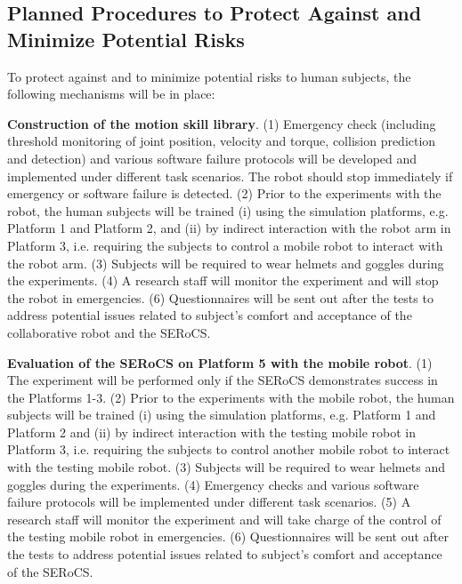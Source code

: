 \subsection{Planned Procedures to Protect Against and Minimize Potential Risks}
To protect against and to minimize potential risks to human subjects, the following mechanisms will be in place:

\textbf{Construction of the motion skill library}.
(1) Emergency check (including threshold monitoring of joint position, velocity and torque, collision prediction and detection)  and various software failure protocols will be developed and implemented under different task scenarios. The robot should stop immediately if emergency or software failure is detected.  (2) Prior to the experiments with the robot, the human subjects will be trained (i) using the simulation platforms, e.g. Platform 1 and Platform 2, and (ii) by indirect interaction with the robot arm in Platform 3, i.e. requiring the subjects to control a mobile robot to interact with the robot arm. (3) Subjects will be required to wear helmets and goggles during the experiments. (4) A research staff will monitor the experiment and will stop the robot in emergencies. (6) Questionnaires will be sent out after the tests to address potential issues related to subject's comfort and acceptance of the collaborative robot and the SERoCS.

\textbf{Evaluation of the SERoCS on Platform 5 with the mobile robot}. (1) The experiment will be performed only if the SERoCS demonstrates success in the Platforms 1-3. (2) Prior to the experiments with the mobile robot, the human subjects will be trained (i) using the simulation platforms, e.g. Platform 1 and Platform 2 and (ii) by indirect interaction with the testing mobile robot in Platform 3, i.e. requiring the subjects to control another mobile robot to interact with the testing mobile robot. (3) Subjects will be required to wear helmets and goggles during the experiments. (4) Emergency checks and various software failure protocols will be implemented under different task scenarios. (5) A research staff will monitor the experiment and will take charge of the control of the testing mobile robot in emergencies. (6) Questionnaires will be sent out after the tests to address potential issues related to subject's comfort and acceptance of the SERoCS.

